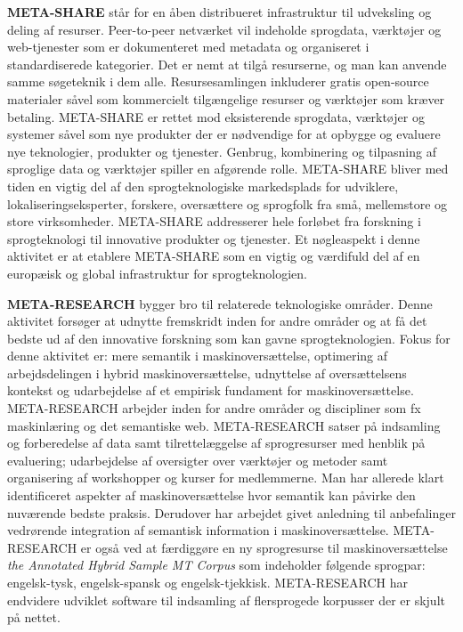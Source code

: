 \documentclass[]{../../metanetpaper}
\begin{document}
\begin{multicols}{2}
\textbf{META-SHARE} st\aa r for en \aa ben distribueret infrastruktur til udveksling og deling af resurser. Peer-to-peer netv\ae rket vil indeholde sprogdata, v\ae rkt\o jer og web-tjenester som er dokumenteret med metadata og organiseret i standardiserede kategorier. Det er nemt at \mbox{tilg\aa} resurserne, og man kan anvende samme s\o geteknik i dem alle. Resursesamlingen inkluderer gratis open-source materialer s\aa vel som kommercielt tilg\ae ngelige resurser og v\ae rkt\o jer som kr\ae ver betaling. META-SHARE er rettet mod eksisterende sprogdata, v\ae rkt\o jer og systemer s\aa vel som nye produkter der er n\o dvendige for at opbygge og evaluere nye teknologier, produkter og tjenester. Genbrug, kombinering og tilpasning af sproglige data og v\ae rkt\o jer spiller en afg\o rende rolle. META-SHARE bliver med tiden en vigtig del af den sprogteknologiske markedsplads for udviklere, lokaliseringseksperter, forskere, overs\ae ttere og sprogfolk fra \mbox{sm\aa}, mellemstore og store virksomheder. META-SHARE addresserer hele forl\o bet fra forskning i sprogteknologi til innovative produkter og tjenester. Et n\o gleaspekt i denne aktivitet er at etablere META-SHARE som en vigtig og v\ae rdifuld del af en europ\ae isk og global infrastruktur for sprogteknologien. 

\textbf{META-RESEARCH} bygger bro til relaterede teknologiske omr\aa der. Denne aktivitet fors\o ger at udnytte fremskridt inden for andre omr\aa der og at \mbox{f\aa} det bedste ud af den innovative forskning som kan gavne sprogteknologien. Fokus for denne aktivitet er: mere semantik i maskinovers\ae ttelse, optimering af arbejdsdelingen i hybrid maskinovers\ae ttelse, udnyttelse af overs\ae ttelsens kontekst og udarbejdelse af et empirisk fundament for maskinovers\ae ttelse. META-RESEARCH arbejder inden for andre omr\aa der og discipliner som fx maskinl\ae ring og det semantiske web. META-RESEARCH satser \mbox{p\aa} indsamling og forberedelse af data samt tilrettel\ae ggelse af sprog\-resurser med henblik \mbox{p\aa} evaluering; udarbejdelse af oversigter over v\ae rkt\o jer og metoder samt organisering af workshopper og kurser for medlemmerne. Man har allerede klart identificeret aspekter af maskinovers\ae ttelse hvor semantik kan p\aa virke den nuv\ae rende bedste praksis. Derudover har arbejdet givet anledning til anbefalinger vedr\o rende integration af semantisk information i maskinovers\ae ttelse. META-RESEARCH er \mbox{ogs\aa} ved at f\ae rdigg\o re en ny sprogresurse til maskinovers\ae ttelse {\it the Annotated Hybrid Sample MT Corpus} som indeholder f\o lgende sprogpar: engelsk-tysk, engelsk-spansk og engelsk-tjekkisk. META-RESEARCH har endvidere udviklet software til indsamling af flersprogede korpusser der er skjult \mbox{p\aa} nettet.


\end{multicols}
\end{document}
